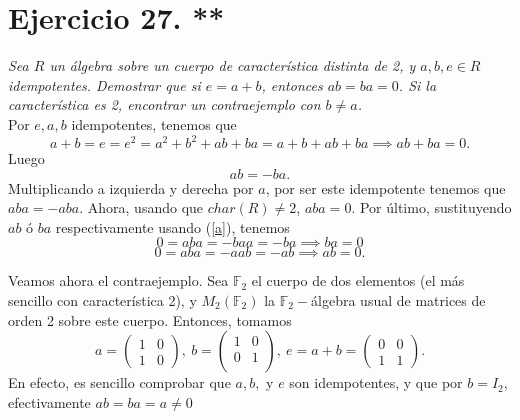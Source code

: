 \section{Ejercicio 27. **}  \textit{Sea $R$ un álgebra sobre un cuerpo de característica distinta de 2, y $a,b,e \in R$ idempotentes. Demostrar que si $e = a + b$, entonces  $ab = ba = 0$. Si la característica es 2, encontrar un contraejemplo con  $b \neq a$.}\\

Por $e, a, b$ idempotentes, tenemos que
\[
    a + b = e = e^2 = a^2 + b^2 + ab + ba = a + b + ab + ba \implies ab + ba = 0
.\]
Luego
\begin{equation}\label{a}
    ab = -ba.
\end{equation}
Multiplicando a izquierda y derecha por $a$, por ser este idempotente tenemos que $aba = -aba$. Ahora, usando que $char(R) \neq 2$, $aba = 0$. Por último, sustituyendo $ab$ ó $ba$ respectivamente usando (\ref{a}), tenemos
\[
    0 = aba = -baa = -ba \implies ba = 0
\]
\[
    0 = aba = -aab = -ab \implies ab = 0
.\]

Veamos ahora el contraejemplo. Sea $\mathbb{F}_2$ el cuerpo de dos elementos (el más sencillo con característica 2), y $M_2(\mathbb{F}_2)$ la $\mathbb{F}_2-$álgebra usual de matrices de orden 2 sobre este cuerpo. Entonces, tomamos
\[
a =
\begin{pmatrix}
    1 & 0 \\
    1 & 0
\end{pmatrix}, \
b =
\begin{pmatrix}
    1 & 0 \\
    0 & 1 \\
\end{pmatrix}, \
e = a + b =
\begin{pmatrix}
    0 & 0 \\
    1 & 1
\end{pmatrix}
.\]
En efecto, es sencillo comprobar que $a, b,$ y $e$ son idempotentes, y que por $b = I_2$, efectivamente $ab = ba = a \neq 0$
